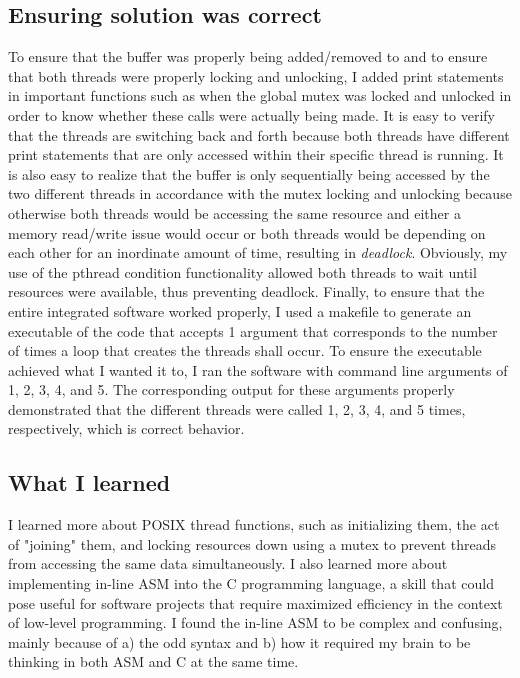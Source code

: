 \documentclass[letterpaper,10pt,titlepage]{article}
\begin{document}
\subsection{Ensuring solution was correct}
To ensure that the buffer was properly being added/removed to and to ensure that both threads were properly locking and unlocking, I added print statements in important functions such as when the global mutex was locked and unlocked in order to know whether these calls were actually being made. It is easy to verify that the threads are switching back and forth because both threads have different print statements that are only accessed within their specific thread is running. It is also easy to realize that the buffer is only sequentially being accessed by the two different threads in accordance with the mutex locking and unlocking because otherwise both threads would be accessing the same resource and either a memory read/write issue would occur or both threads would be depending on each other for an inordinate amount of time, resulting in \emph{deadlock}. Obviously, my use of the pthread condition functionality allowed both threads to wait until resources were available, thus preventing deadlock. Finally, to ensure that the entire integrated software worked properly, I used a makefile to generate an executable of the code that accepts 1 argument that corresponds to the number of times a loop that creates the threads shall occur. To ensure the executable achieved what I wanted it to, I ran the software with command line arguments of 1, 2, 3, 4, and 5. The corresponding output for these arguments properly demonstrated that the different threads were called 1, 2, 3, 4, and 5 times, respectively, which is correct behavior.

\subsection{What I learned}
I learned more about POSIX thread functions, such as initializing them, the act of "joining" them, and locking resources down using a mutex to prevent threads from accessing the same data simultaneously. I also learned more about implementing in-line ASM into the C programming language, a skill that could pose useful for software projects that require maximized efficiency in the context of low-level programming. I found the in-line ASM to be complex and confusing, mainly because of a) the odd syntax and b) how it required my brain to be thinking in both ASM and C at the same time.
\end{document}
